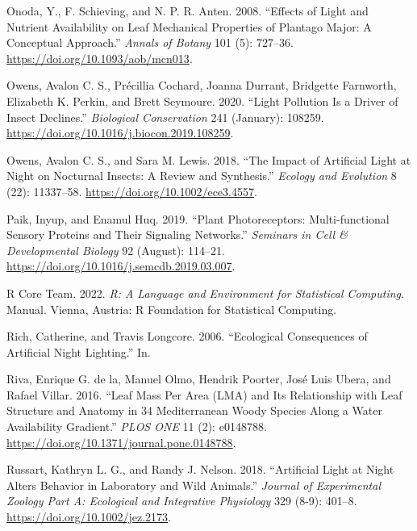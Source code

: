 \documentclass[
  letterpaper,
  DIV=11,
  numbers=noendperiod]{scrartcl}
\newlength{\cslhangindent}
\newlength{\cslentryspacingunit} %
\newenvironment{CSLReferences}[2] %
 {%
  \setlength{\parindent}{0pt}
  \ifodd #1
  \let\oldpar\par
  \def\par{\hangindent=\cslhangindent\oldpar}
  \fi
  \setlength{\parskip}{#2\cslentryspacingunit}
 }%
 {}
\begin{document}
\begin{CSLReferences}{1}{0}
\leavevmode{}%
Onoda, Y., F. Schieving, and N. P. R. Anten. 2008. {``Effects of {Light}
and {Nutrient Availability} on {Leaf Mechanical Properties} of
{Plantago} Major: {A Conceptual Approach}.''} \emph{Annals of Botany}
101 (5): 727--36. \url{https://doi.org/10.1093/aob/mcn013}.

\leavevmode{}%
Owens, Avalon C. S., Précillia Cochard, Joanna Durrant, Bridgette
Farnworth, Elizabeth K. Perkin, and Brett Seymoure. 2020. {``Light
Pollution Is a Driver of Insect Declines.''} \emph{Biological
Conservation} 241 (January): 108259.
\url{https://doi.org/10.1016/j.biocon.2019.108259}.

\leavevmode{}%
Owens, Avalon C. S., and Sara M. Lewis. 2018. {``The Impact of
Artificial Light at Night on Nocturnal Insects: {A} Review and
Synthesis.''} \emph{Ecology and Evolution} 8 (22): 11337--58.
\url{https://doi.org/10.1002/ece3.4557}.

\leavevmode{}%
Paik, Inyup, and Enamul Huq. 2019. {``Plant Photoreceptors:
{Multi-functional} Sensory Proteins and Their Signaling Networks.''}
\emph{Seminars in Cell \& Developmental Biology} 92 (August): 114--21.
\url{https://doi.org/10.1016/j.semcdb.2019.03.007}.

\leavevmode{}%
R Core Team. 2022. \emph{R: {A} Language and Environment for Statistical
Computing}. Manual. {Vienna, Austria}: {R Foundation for Statistical
Computing}.

\leavevmode{}%
Rich, Catherine, and Travis Longcore. 2006. {``Ecological Consequences
of Artificial Night Lighting.''} In.

\leavevmode{}%
Riva, Enrique G. de la, Manuel Olmo, Hendrik Poorter, José Luis Ubera,
and Rafael Villar. 2016. {``Leaf {Mass} Per {Area} ({LMA}) and {Its
Relationship} with {Leaf Structure} and {Anatomy} in 34 {Mediterranean
Woody Species} Along a {Water Availability Gradient}.''} \emph{PLOS ONE}
11 (2): e0148788. \url{https://doi.org/10.1371/journal.pone.0148788}.

\leavevmode{}%
Russart, Kathryn L. G., and Randy J. Nelson. 2018. {``Artificial Light
at Night Alters Behavior in Laboratory and Wild Animals.''}
\emph{Journal of Experimental Zoology Part A: Ecological and Integrative
Physiology} 329 (8-9): 401--8. \url{https://doi.org/10.1002/jez.2173}.


\end{CSLReferences}
\end{document}

